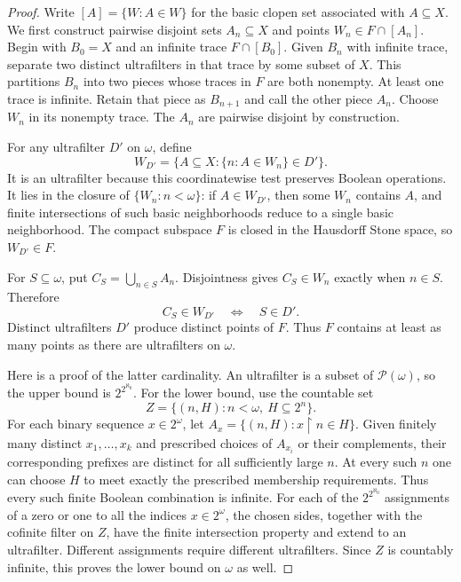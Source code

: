 \documentclass[11pt,letterpaper]{article}
\theoremstyle{definition}
\numberwithin{equation}{section}
\newcommand{\powerset}{\mathcal P}
\begin{document}
\begin{proof}
Write $[A]=\{W:A\in W\}$ for the basic clopen set associated with
$A\subseteq X$. We first construct pairwise disjoint sets $A_n\subseteq X$
and points $W_n\in F\cap[A_n]$. Begin with $B_0=X$ and an infinite trace
$F\cap[B_0]$. Given $B_n$ with infinite trace, separate two distinct
ultrafilters in that trace by some subset of $X$. This partitions $B_n$
into two pieces whose traces in $F$ are both nonempty. At least one trace
is infinite. Retain that piece as $B_{n+1}$ and call the other piece
$A_n$. Choose $W_n$ in its nonempty trace. The $A_n$ are pairwise
disjoint by construction.

For any ultrafilter $D'$ on $\omega$, define
\[
 W_{D'}=\{A\subseteq X:\{n:A\in W_n\}\in D'\}.
\]
It is an ultrafilter because this coordinatewise test preserves Boolean
operations. It lies in the closure of $\{W_n:n<\omega\}$: if
$A\in W_{D'}$, then some $W_n$ contains $A$, and finite intersections
of such basic neighborhoods reduce to a single basic neighborhood.
The compact subspace $F$ is closed in the Hausdorff Stone space, so
$W_{D'}\in F$.

For $S\subseteq\omega$, put $C_S=\bigcup_{n\in S}A_n$.
Disjointness gives $C_S\in W_n$ exactly when $n\in S$. Therefore
\[
 C_S\in W_{D'}\quad\Longleftrightarrow\quad S\in D'.
\]
Distinct ultrafilters $D'$ produce distinct points of $F$. Thus $F$
contains at least as many points as there are ultrafilters on $\omega$.

Here is a proof of the latter cardinality. An ultrafilter is a subset
of $\powerset(\omega)$, so the upper bound is $2^{2^{\aleph_0}}$.
For the lower bound, use the countable set
\[
 Z=\{(n,H):n<\omega,\ H\subseteq 2^n\}.
\]
For each binary sequence $x\in2^\omega$, let
$A_x=\{(n,H):x\restriction n\in H\}$. Given finitely many distinct
$x_1,\ldots,x_k$ and prescribed choices of $A_{x_i}$ or their
complements, their corresponding prefixes are distinct for all
sufficiently large $n$. At every such $n$ one can choose $H$ to meet
exactly the prescribed membership requirements. Thus every such finite
Boolean combination is infinite. For each of the
$2^{2^{\aleph_0}}$ assignments of a zero or one to all the indices
$x\in2^\omega$, the chosen sides, together with the cofinite filter on
$Z$, have the finite intersection property and extend to an ultrafilter.
Different assignments require different ultrafilters. Since $Z$ is
countably infinite, this proves the lower bound on $\omega$ as well.
\end{proof}
\end{document}
